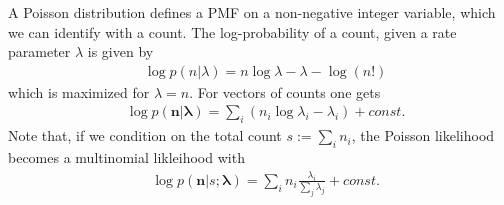 \documentclass{article}
\begin{document}
A Poisson distribution defines a PMF on a non-negative integer variable, which we can identify with a count. The log-probability of a count, given a rate parameter $\lambda$ is given by 
\begin{align}
& \log p(n | \lambda) = n \log \lambda - \lambda - \log(n!)
\label{eq:poisson}
\end{align}
which is maximized for $\lambda = n$. For vectors of counts one gets
\begin{align}
& \log p(\mathbf n | \mathbf \lambda) = \sum_i \left( n_i \log \lambda_i - \lambda_i \right) + const. 
\label{eq:vector-poisson}
\end{align}
Note that, if we condition on the total count $s := \sum_i n_i$, the Poisson likelihood becomes a multinomial likleihood with 
\begin{align}
& \log p(\mathbf n | s; \mathbf \lambda) = \sum_i n_i \frac{\lambda_i}{\sum_j \lambda_j } + const. 
\end{align}  
\end{document}
